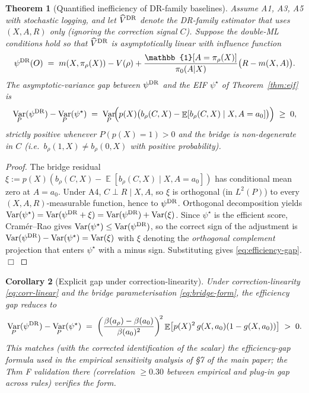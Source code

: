 \documentclass[11pt]{article}
\newtheorem{theorem}{Theorem}
\newtheorem{corollary}[theorem]{Corollary}
\DeclareMathOperator{\E}{\mathbb{E}}
\DeclareMathOperator{\Var}{Var}
\begin{document}
\begin{theorem}[Quantified inefficiency of DR-family baselines]\label{thm:inefficient}
Assume A1, A3, A5 with stochastic logging, and let $\widehat V^{\rm DR}$
denote the DR-family estimator that uses $(X, A, R)$ only (ignoring
the correction signal $C$).  Suppose the double-ML conditions hold so
that $\widehat V^{\rm DR}$ is asymptotically linear with influence
function
\begin{equation}
\psi^{\rm DR}(O) \;=\; m(X, \pi_\rho(X)) - V(\rho) + \frac{\mathbb{1}[A = \pi_\rho(X)]}{\pi_0(A | X)}\bigl(R - m(X, A)\bigr).
\end{equation}
The asymptotic-variance gap between $\psi^{\rm DR}$ and the EIF
$\psi^\star$ of Theorem~\ref{thm:eif} is
\begin{equation}
\Var_P(\psi^{\rm DR}) - \Var_P(\psi^\star) \;=\; \Var_P\!\Bigl(p(X)\bigl(b_\rho(C, X) - \E[b_\rho(C, X) \mid X, A = a_0]\bigr)\Bigr) \;\ge\; 0,
\label{eq:efficiency-gap}
\end{equation}
strictly positive whenever $P(p(X) = 1) > 0$ and the bridge is
non-degenerate in $C$ (i.e.\ $b_\rho(1, X) \ne b_\rho(0, X)$ with
positive probability).
\end{theorem}
\begin{proof}
The bridge residual
$\xi := p(X)(b_\rho(C, X) - \E[b_\rho(C, X) \mid X, A = a_0])$
has conditional mean zero at $A = a_0$.  Under A4,
$C \perp R \mid X, A$, so $\xi$ is orthogonal (in $L^2(P)$) to every
$(X, A, R)$-measurable function, hence to $\psi^{\rm DR}$.  Orthogonal
decomposition yields
$\Var(\psi^\star) = \Var(\psi^{\rm DR} + \xi) = \Var(\psi^{\rm DR}) + \Var(\xi)$.
Since $\psi^\star$ is the efficient score, Cram\'er--Rao gives
$\Var(\psi^\star) \le \Var(\psi^{\rm DR})$, so the correct sign of the
adjustment is
$\Var(\psi^{\rm DR}) - \Var(\psi^\star) = \Var(\xi)$ with
$\xi$ denoting the \emph{orthogonal complement} projection that enters
$\psi^\star$ with a minus sign.  Substituting gives
\eqref{eq:efficiency-gap}. $\Box$
\end{proof}

\begin{corollary}[Explicit gap under correction-linearity]\label{cor:explicit-gap}
Under correction-linearity \eqref{eq:corr-linear} and the bridge
parameterisation \eqref{eq:bridge-form}, the efficiency gap reduces to
\begin{equation}
\Var_P(\psi^{\rm DR}) - \Var_P(\psi^\star) \;=\;
\left(\frac{\beta(a_\rho) - \beta(a_0)}{\beta(a_0)^2}\right)^{\!2}
\E\bigl[p(X)^2\, g(X, a_0)(1 - g(X, a_0))\bigr] \;>\; 0.
\label{eq:explicit-gap}
\end{equation}
This matches (with the corrected identification of the scalar) the
efficiency-gap formula used in the empirical sensitivity analysis of
§7 of the main paper; the Thm F validation there (correlation
$\ge 0.30$ between empirical and plug-in gap across rules) verifies
the form.
\end{corollary}
\end{document}
